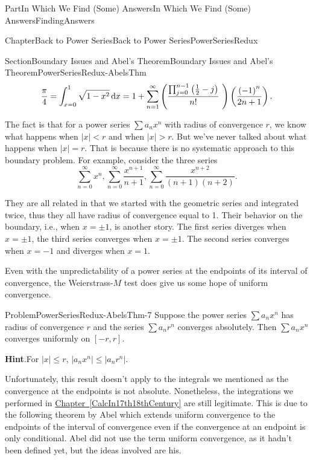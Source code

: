 \documentclass[oneside,10pt,]{book}
\newcommand{\blocktitlefont}{\relax}
\newcommand{\xreffont}{\relax}
\numberwithin{equation}{part}
\newcommand{\dx}[1]{\,{\rm d}#1}
\newcommand{\lt}{<}
\begin{document}
\begin{partptx}{Part}{In Which We Find (Some) Answers}{}{In Which We Find (Some) Answers}{}{}{FindingAnswers}
\begin{chapterptx}{Chapter}{Back to Power Series}{}{Back to Power Series}{}{}{PowerSeriesRedux}
\begin{sectionptx}{Section}{Boundary Issues and Abel's Theorem}{}{Boundary Issues and Abel's Theorem}{}{}{PowerSeriesRedux-AbelsThm}
\begin{equation*}
\frac{\pi}{4}=\int_{x=0}^1\sqrt{1-x^2}\dx{x}=1+\sum_{n=1}^\infty\left(\frac{\prod_{j=0}^{n-1}\left(\frac{1}{2}-j\right)}{n!}\text{ } \right)\left(\frac{\left(-1\right)^n}{2n+1}\right)\text{.}
\end{equation*}
%
\par
The fact is that for a power series \(\sum a_nx^n\) with radius of convergence \(r\), we know what happens when \(|x|\lt r\) and when \(|x|>r\). But we've never talked about what happens when \(|x|=r\).  That is because there is no systematic approach to this boundary problem.  For example, consider the three series%
\begin{equation*}
\sum_{n=0}^\infty x^n,\sum_{n=0}^\infty\frac{x^{n+1}}{n+1}, \sum_{n=0}^\infty\frac{x^{n+2}}{(n+1)(n+2)}\text{.}
\end{equation*}
%
\par
They are all related in that we started with the geometric series and integrated twice, thus they all have radius of convergence equal to 1.  Their behavior on the boundary, i.e., when \(x=\pm 1\), is another story.  The first series diverges when \(x=\pm 1\), the third series converges when \(x=\pm 1\).  The second series converges when \(x=-1\) and diverges when \(x=1\).%
\par
Even with the unpredictability of a power series at the endpoints of its interval of convergence, the Weierstrass-\(M\) test does give us some hope of uniform convergence.%
\begin{problem}{Problem}{}{PowerSeriesRedux-AbelsThm-7}%
Suppose the power series \(\sum a_nx^n\) has radius of convergence \(r\) and the series \(\sum a_nr^n\) converges absolutely.  Then \(\sum a_nx^n\) converges uniformly on \([-r,r]\).%
\par\smallskip%
\noindent\textbf{\blocktitlefont Hint}.\hypertarget{PowerSeriesRedux-AbelsThm-7-4}{}\quad{}For \(|x|\leq r\), \(|a_nx^n|\leq |a_nr^n|\).%
\end{problem}
Unfortunately, this result doesn't apply to the integrals we mentioned as the convergence at the endpoints is not absolute. Nonetheless, the integrations we performed in \hyperref[CalcIn17th18thCentury]{Chapter~{\xreffont\ref{CalcIn17th18thCentury}}} are still legitimate. This is due to the following theorem by Abel which extends uniform convergence to the endpoints of the interval of convergence even if the convergence at an endpoint is only conditional.  Abel did not use the term uniform convergence, as it hadn't been defined yet, but the ideas involved are his.%

\end{sectionptx}
\end{chapterptx}
\end{partptx}
\end{document}
